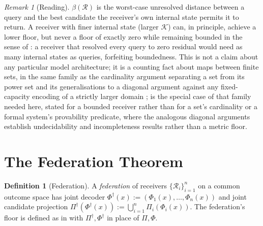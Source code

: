\documentclass[11pt,twocolumn,a4paper]{article}
\theoremstyle{rdm}
\theoremstyle{definition}
\newtheorem{definition}[theorem]{Definition}
\theoremstyle{remark}
\newtheorem{remark}[theorem]{Remark}
\newcommand{\flo}{\beta}
\newcommand{\Rec}{\mathcal{R}}
\newcommand{\Know}{\mathcal{K}}
\begin{document}
\begin{remark}[Reading]
\label{rem:floor-reading}
$\flo(\Rec)$ is the worst-case unresolved distance between a query and the
best candidate the receiver's own internal state permits it to return. A
receiver with finer internal state (larger $\Know$) can, in principle,
achieve a lower floor, but never a floor of exactly zero while remaining
bounded in the sense of : a receiver that resolved every
query to zero residual would need as many internal states as queries,
forfeiting boundedness. This is not a claim about any particular model
architecture; it is a counting fact about maps between finite sets, in the
same family as the cardinality argument separating a set from its power set
\citep{cantor1891} and its generalisations to a diagonal argument against
any fixed-capacity encoding of a strictly larger domain
\citep{lawvere1969};  is the special case of that family
needed here, stated for a bounded receiver rather than for a set's
cardinality or a formal system's provability predicate, where the analogous
diagonal arguments establish undecidability and incompleteness results
\citep{godel1931,turing1936,tarski1936} rather than a metric floor.
\end{remark}

\section{The Federation Theorem}
\label{sec:federation}

\begin{definition}[Federation]
\label{def:federation}
A \emph{federation} of receivers $\{\Rec_i\}_{i=1}^n$ on a common outcome
space has joint decoder $\Phi^\dagger(x) := (\Phi_1(x),\dots,\Phi_n(x))$ and
joint candidate projection
$\Pi^\dagger(\Phi^\dagger(x)) := \bigcup_{i=1}^n \Pi_i(\Phi_i(x))$.
The federation's floor is defined as in  with
$\Pi^\dagger,\Phi^\dagger$ in place of $\Pi,\Phi$.
\end{definition}
\end{document}
